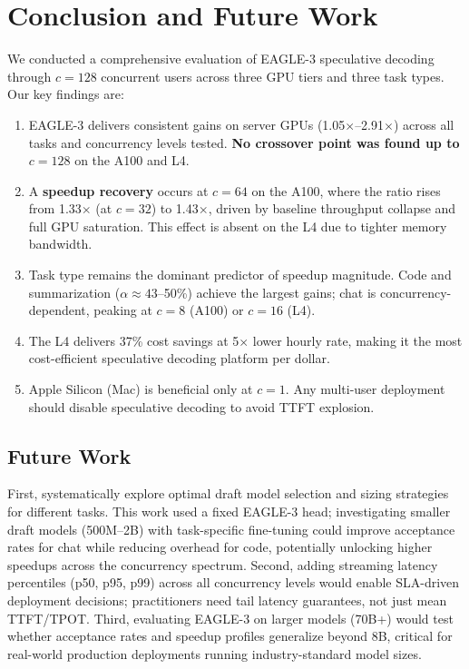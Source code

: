 \documentclass[10pt,twocolumn]{article}
\begin{document}
\section{Conclusion and Future Work}
\label{sec:conclusion}

We conducted a comprehensive evaluation of EAGLE-3 speculative decoding through
$c=128$ concurrent users across three GPU tiers and three task types.  Our
key findings are:

\begin{enumerate}[leftmargin=1.5em,itemsep=2pt,topsep=4pt]
  \item EAGLE-3 delivers consistent gains on server GPUs (1.05$\times$--2.91$\times$)
        across all tasks and concurrency levels tested.  \textbf{No crossover
        point was found up to $c=128$} on the A100 and L4.

  \item A \textbf{speedup recovery} occurs at $c=64$ on the A100, where the
        ratio rises from 1.33$\times$ (at $c=32$) to 1.43$\times$, driven by
        baseline throughput collapse and full GPU saturation.  This effect is
        absent on the L4 due to tighter memory bandwidth.

  \item Task type remains the dominant predictor of speedup magnitude.  Code and
        summarization ($\alpha \approx 43$--50\%) achieve the largest gains; chat
        is concurrency-dependent, peaking at $c=8$ (A100) or $c=16$ (L4).

  \item The L4 delivers 37\% cost savings at 5$\times$ lower hourly rate,
        making it the most cost-efficient speculative decoding platform per dollar.

  \item Apple Silicon (Mac) is beneficial only at $c=1$.  Any multi-user
        deployment should disable speculative decoding to avoid TTFT explosion.
\end{enumerate}

\subsection*{Future Work}

First, systematically explore optimal draft model selection and sizing strategies
for different tasks. This work used a fixed EAGLE-3 head; investigating smaller draft
models (500M--2B) with task-specific fine-tuning could improve acceptance rates for chat
while reducing overhead for code, potentially unlocking higher speedups across the concurrency spectrum.
Second, adding streaming latency percentiles (p50, p95, p99) across all concurrency levels would enable
SLA-driven deployment decisions; practitioners need tail latency guarantees, not
just mean TTFT/TPOT.  Third, evaluating EAGLE-3 on larger models (70B+) would
test whether acceptance rates and speedup profiles generalize beyond 8B, critical
for real-world production deployments running industry-standard model sizes.
\end{document}
